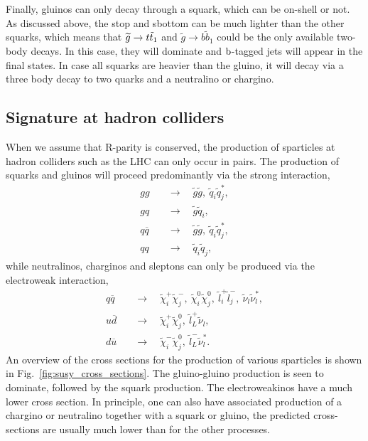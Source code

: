Finally, gluinos can only decay through a squark, which can be on-shell or not. 
As discussed above, the stop and sbottom can be much lighter than the other squarks, which means
that $\widetilde{g} \rightarrow t\tilde{t}_1$ and $\widetilde{g} \rightarrow b\widetilde{b}_1$ could
be the only available two-body decays. In this case, they will dominate and $\mathrm{b}$-tagged jets will
appear in the final states. 
In case all squarks are heavier than the gluino, it will decay via a three body decay to two quarks
and a neutralino or chargino. 


\subsection{Signature at hadron colliders}

When we assume that R-parity is conserved, the production of sparticles at hadron colliders such as
the LHC can only occur in pairs. 
The production of squarks and gluinos will proceed predominantly via the strong interaction, 
\begin{align}
  gg \quad &\rightarrow \quad \tilde{g}\tilde{g}, \ \tilde{q}_i\tilde{q}_j^*, \\
  gq \quad &\rightarrow \quad \tilde{g}\tilde{q}_i, \\
  q\overline{q} \quad &\rightarrow \quad \tilde{g}\tilde{g}, \ \tilde{q}_i\tilde{q}_j^*, \\
  qq \quad &\rightarrow \quad \tilde{q}_i\tilde{q}_j, 
\end{align}
while neutralinos, charginos and sleptons can only be produced via the electroweak interaction, 
\begin{align}
  q\overline{q} \quad &\rightarrow \quad \tilde{\chi}_i^+\tilde{\chi}_j^-,\ 
\tilde{\chi}_i^0\tilde{\chi}_j^0, \ \tilde{l}_i^+\tilde{l}_j^-, \ \tilde{\nu}_l\tilde{\nu}_l^*, \\
  u\overline{d} \quad &\rightarrow \quad \tilde{\chi}_i^+ \tilde{\chi}_j^0, \
\tilde{l}_L^+\tilde{\nu}_l, \\
  d\overline{u} \quad &\rightarrow \quad \tilde{\chi}_i^- \tilde{\chi}_j^0, \
\tilde{l}_L^-\tilde{\nu}_l^* .
\end{align}
An overview of the cross sections for the production of various sparticles is shown in
Fig.~\ref{fig:susy_cross_sections}. The gluino-gluino production is seen to dominate, followed by
the squark production. The electroweakinos have a much lower cross section. 
In principle, one can also have associated production of a chargino or neutralino together with a
squark or gluino, the predicted cross-sections are usually much lower than for the other processes.

